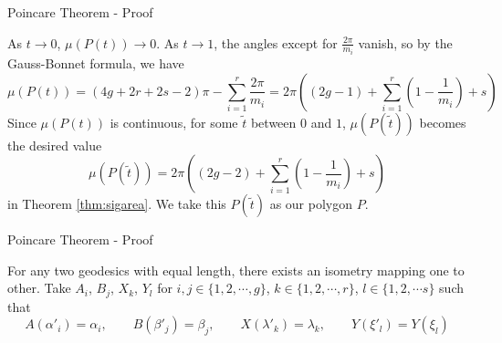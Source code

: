 \documentclass[
	american,
	sections numbered,
	usenames,
	xcolor=dvipsnames,
	aspectratio=169,
]{beamer}
\theoremstyle{plain}%
\begin{document}
\begin{frame}[plain]
\begin{figure}
    \end{figure}

\end{frame}

\begin{frame}{Poincare Theorem - Proof}

	As $t\rightarrow 0$, $\mu(P(t))\rightarrow 0$. As $t\rightarrow 1$, the angles except for $\frac{2\pi}{m_i}$ vanish, so by the Gauss-Bonnet formula, we have $$\mu(P(t))=(4g+2r+2s-2)\pi-\sum_{i=1}^r\frac{2\pi}{m_i}=2\pi\left((2g-1)+\sum_{i=1}^r\left(1-\frac{1}{m_i}\right)+s\right)$$
    Since $\mu(P(t))$ is continuous, for some $\tilde{t}$ between $0$ and $1$, $\mu(P(\tilde{t}))$ becomes the desired value 
    $$\mu(P(\tilde{t}))=2\pi\left((2g-2)+\sum_{i=1}^r\left(1-\frac{1}{m_i}\right)+s\right)$$
    in Theorem \ref{thm:sigarea}. We take this $P(\tilde{t})$ as our polygon $P$.

\end{frame}

\begin{frame}{Poincare Theorem - Proof}

	For any two geodesics with equal length, there exists an isometry mapping one to other. Take $A_i$, $B_j$, $X_k$, $Y_l$ for $i,j\in\{1,2,\cdots,g\}$, $k\in\{1,2,\cdots,r\}$, $l\in\{1,2,\cdots s\}$ such that
    $$A(\alpha'_i)=\alpha_i,\qquad B(\beta'_j)=\beta_j,\qquad X(\lambda'_k)=\lambda_k,\qquad Y(\xi'_l)=Y(\xi_l)$$

\end{frame}
\end{document}
